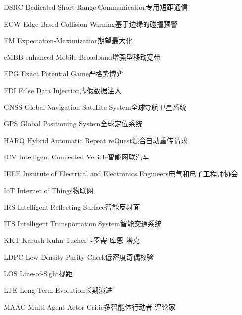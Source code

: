 \begin{abbreviate}[0mm][18mm]
\item[DSRC] Dedicated Short-Range Communication\hspace{1em}专用短距通信
\item[ECW] Edge-Based Collision Warning\hspace{1em}基于边缘的碰撞预警
\item[EM] Expectation-Maximization\hspace{1em}期望最大化
\item[eMBB] enhanced Mobile Broadband\hspace{1em}增强型移动宽带
\item[EPG] Exact Potential Game\hspace{1em}严格势博弈
\item[FDI] False Data Injection\hspace{1em}虚假数据注入
\item[GNSS] Global Navigation Satellite System\hspace{1em}全球导航卫星系统
\item[GPS] Global Positioning System\hspace{1em}全球定位系统
\item[HARQ] Hybrid Automatic Repeat reQuest\hspace{1em}混合自动重传请求
\item[ICV] Intelligent Connected Vehicle\hspace{1em}智能网联汽车
\item[IEEE] Institute of Electrical and Electronics Engineers\hspace{1em}电气和电子工程师协会
\item[IoT] Internet of Things\hspace{1em}物联网
\item[IRS] Intelligent Reflecting Surface\hspace{1em}智能反射面
\item[ITS] Intelligent Transportation System\hspace{1em}智能交通系统
\item[KKT] Karush-Kuhn-Tucher\hspace{1em}卡罗需-库恩-塔克
\item[LDPC] Low Density Parity Check\hspace{1em}低密度奇偶校验
\item[LOS] Line-of-Sight\hspace{1em}视距
\item[LTE] Long-Term Evolution\hspace{1em}长期演进
\item[MAAC] Multi-Agent Actor-Critic\hspace{1em}多智能体行动者-评论家

\end{abbreviate}
